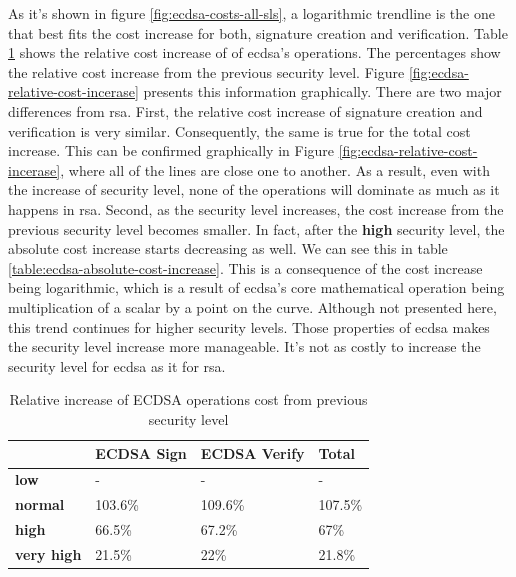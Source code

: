 \documentclass{llncs}
\begin{document}
As it's shown in figure \ref{fig:ecdsa-costs-all-sls}, a logarithmic trendline is the one that best fits the cost increase for both,
signature creation and verification.
Table \ref{table:ecdsa-relative-cost-increase} shows the relative cost increase of of \gls{ecdsa}'s operations. The percentages
show the relative cost increase from the previous security level. Figure \ref{fig:ecdsa-relative-cost-incerase} presents this information
graphically. There are two major differences from \gls{rsa}. First, the relative cost increase
of signature creation and verification is very similar. Consequently, the same is true for the total cost increase. This can be confirmed
graphically in Figure \ref{fig:ecdsa-relative-cost-incerase}, where all of the lines are
close one to another. As a result, even with the increase of security level, none of the operations will dominate as much as it happens
in \gls{rsa}. Second, as the security level increases, the cost increase from the previous security level becomes smaller. In fact, after the
\textbf{high} security level, the absolute cost increase starts decreasing as well. We can see this in table \ref{table:ecdsa-absolute-cost-increase}.
This is a consequence of the cost increase being logarithmic, which is a result of \gls{ecdsa}'s core mathematical operation being
multiplication of a scalar by a point on the curve. Although not presented here, this trend continues for higher security levels.
Those properties of \gls{ecdsa} makes the security level increase more manageable. It's not as costly to increase the security level for
\gls{ecdsa} as it for \gls{rsa}.

\begin{table}[]
  \begin{tabular}{|l|l|l|l|}
    \hline
  & \textbf{ECDSA Sign} & \textbf{ECDSA Verify} & \textbf{Total} \\ \hline
  \textbf{low}       & -                 & -                   & -              \\ \hline
  \textbf{normal}    & 103.6\%           & 109.6\%             & 107.5\%        \\ \hline
  \textbf{high}      & 66.5\%            & 67.2\%              & 67\%           \\ \hline
  \textbf{very high} & 21.5\%            & 22\%                & 21.8\%         \\ \hline
  \end{tabular}
  \centering \caption{\label{table:ecdsa-relative-cost-increase} Relative increase of ECDSA operations cost from previous security level}
  \end{table}
\end{document}
